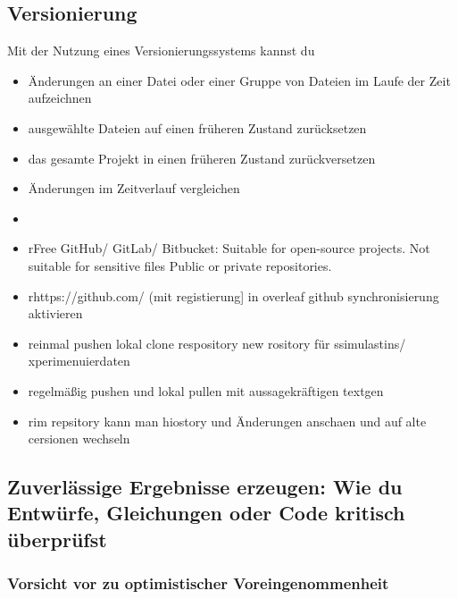 \subsection{Versionierung}



Mit der Nutzung eines Versionierungssystems kannst du
\begin{itemize}
    \item Änderungen an einer Datei oder einer Gruppe von Dateien im Laufe der Zeit aufzeichnen
    \item ausgewählte Dateien auf einen früheren Zustand zurücksetzen
    \item das gesamte Projekt in einen früheren Zustand zurückversetzen 
    \item Änderungen im Zeitverlauf vergleichen
    \item 
    
\end{itemize}
 
\begin{itemize}

\item rFree GitHub/ GitLab/ Bitbucket: 
Suitable for open-source projects. Not suitable for sensitive files 
Public or private repositories.

\item rhttps://github.com/
(mit registierung] in overleaf github synchronisierung aktivieren

\item reinmal pushen lokal clone respository new rository für ssimulastins/ xperimenuierdaten

\item regelmäßig pushen und lokal pullen mit aussagekräftigen textgen

\item rim repsitory kann man hiostory und Änderungen anschaen und auf alte cersionen wechseln
    
\end{itemize}

\subsection[Zuverlässige Ergebnisse erzeugen]{Zuverlässige Ergebnisse erzeugen: Wie du Entwürfe, Gleichungen oder Code kritisch überprüfst}

\subsubsection{Vorsicht vor zu optimistischer Voreingenommenheit}


